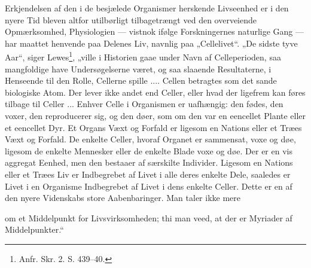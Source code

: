 \documentclass[12pt,a4paper]{book}
\begin{document}
Erkjendelsen af den i de besjælede Organismer herskende Livseenhed er i
den nyere Tid bleven altfor utilbørligt tilbagetrængt ved den overveiende
Opmærksomhed, Physiologien --- vistnok ifølge Forskningernes naturlige
Gang --- har maattet henvende paa Delenes Liv, navnlig paa
„Cellelivet“. „De sidste tyve Aar“, siger Lewes\footnote{Anfr. Skr. 2.
S. 439--40.}, „ville i Historien gaae under Navn af Celleperioden, saa
mangfoldige have Undersøgelserne været, og saa slaaende Resultaterne, i
Henseende til den Rolle, Cellerne spille .... Cellen betragtes som det
sande biologiske Atom. Der lever ikke andet end Celler, eller hvad der
ligefrem kan føres tilbage til Celler ... Enhver Celle i Organismen er
uafhængig: den fødes, den voxer, den reproducerer sig, og den døer, som
om den var en eencellet Plante eller et eencellet Dyr. Et Organs Væxt og
Forfald er ligesom en Nations eller et Træes Væxt og Forfald. De enkelte
Celler, hvoraf Organet er sammensat, voxe og døe, ligesom de enkelte
Mennesker eller de enkelte Blade voxe og døe. Der er en vis aggregat
Eenhed, men den bestaaer af særskilte Individer. Ligesom en Nations eller
et Træes Liv er Indbegrebet af Livet i alle deres enkelte Dele, saaledes
er Livet i en Organisme Indbegrebet af Livet i dens enkelte Celler. Dette
er en af den nyere Videnskabs store Aabenbaringer. Man taler ikke mere

om et Middelpunkt for Livsvirksomheden; thi man veed, at der er Myriader
af Middelpunkter.“
\end{document}
